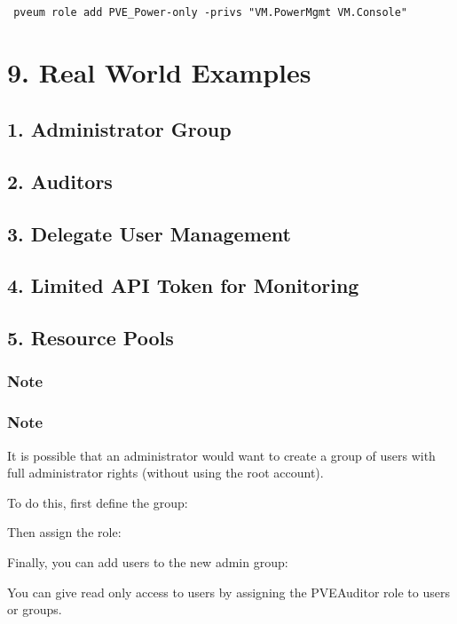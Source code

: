 \begin{lstlisting}

 pveum role add PVE_Power-only -privs "VM.PowerMgmt VM.Console"

\end{lstlisting}


\section{9. Real World Examples}

\subsection{1. Administrator Group}

\subsection{2. Auditors}

\subsection{3. Delegate User Management}

\subsection{4. Limited API Token for Monitoring}

\subsection{5. Resource Pools}

\subsubsection{Note}

\subsubsection{Note}

It is possible that an administrator would want to create a group of users with full administrator rights (without using the root account).

To do this, first define the group:

Then assign the role:

Finally, you can add users to the new admin group:

You can give read only access to users by assigning the PVEAuditor role to users or groups.

